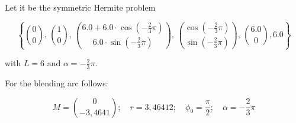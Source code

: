 \BEISPIEL
{
  Let it be the symmetric Hermite problem 
  
  $$\left\{\binom{0}{0},\, \binom{1}{0},\,
  \binom{6.0+6.0\cdot \cos\left(-\frac{2}{3}\pi\right)}{6.0\cdot \sin\left(-\frac{2}{3}\pi\right)},\, \binom{\cos\left(-\frac{2}{3}\pi\right)}{\sin\left(-\frac{2}{3}\pi\right)},\, \binom{6.0}{0},6.0\right\}$$
  
  with $L=6$ and $\alpha=-\frac{2}{3}\pi$.
  
  For the blending arc follows:
  
  
  $$M=\binom{0}{-3,4641}; \quad r=3,46412;\quad \phi_0 = \frac{\pi}{2}; \quad \alpha=-\frac{2}{3}\pi$$
  
  
  \begin{center}
  \end{center}  
}



